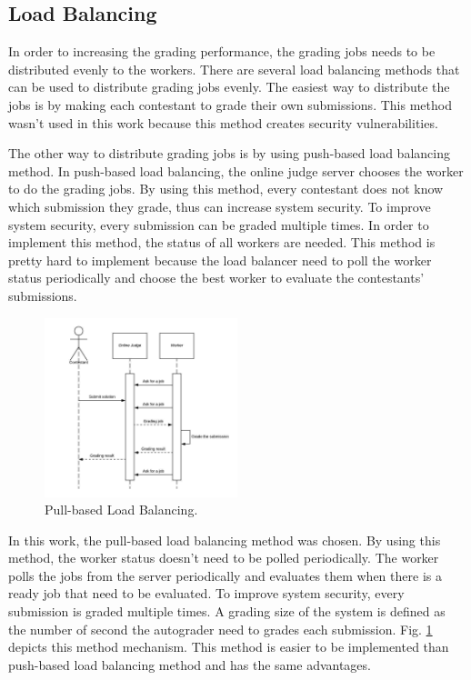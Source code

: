 \documentclass[conference,a4paper]{IEEEtran}
\begin{document}
\subsection{Load Balancing}

In order to increasing the grading performance, the grading jobs needs to be distributed evenly to the workers. There are several load balancing methods that can be used to distribute grading jobs evenly. The easiest way to distribute the jobs is by making each contestant to grade their own submissions. This method wasn't used in this work because this method creates security vulnerabilities.

The other way to distribute grading jobs is by using push-based load balancing method. In push-based load balancing, the online judge server chooses the worker to do the grading jobs. By using this method, every contestant does not know which submission they grade, thus can increase system security. To improve system security, every submission can be graded multiple times. In order to implement this method, the status of all workers are needed. This method is pretty hard to implement because the load balancer need to poll the worker status periodically and choose the best worker to evaluate the contestants' submissions.

\begin{figure}[htbp]
\centerline{\includegraphics[width=0.5\textwidth]{images/paper-pull-based-load-balancing.jpeg}}
\caption{Pull-based Load Balancing.}
\label{pull-based-load-balancing}
\end{figure}

In this work, the pull-based load balancing method was chosen. By using this method, the worker status doesn't need to be polled periodically. The worker polls the jobs from the server periodically and evaluates them when there is a ready job that need to be evaluated. To improve system security, every submission is graded multiple times. A grading size of the system is defined as the number of second the autograder need to grades each submission. Fig. \ref{pull-based-load-balancing} depicts this method mechanism. This method is easier to be implemented than push-based load balancing method and has the same advantages.
\end{document}
